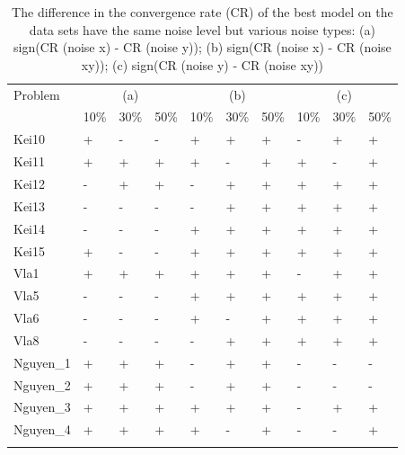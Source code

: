 \begin{table}
\caption{The difference in the convergence rate (CR) of the best model on the data sets have the same noise level but various noise types: (a) sign(CR (noise x) - CR (noise y)); (b) sign(CR (noise x) - CR (noise xy)); (c) sign(CR (noise y) - CR (noise xy))}
\label{tab:difCR2}
\begin{tabular}{l|lll|lll|lll}
\hline\noalign{\smallskip}
Problem & \multicolumn{3}{c|}{(a)} & \multicolumn{3}{c|}{(b)} & \multicolumn{3}{c}{(c)} \\
 & 10\% & 30\%  & 50\%  & 10\% & 30\% & 50\% & 10\% & 30\%  & 50\% \\
\noalign{\smallskip}\hline\noalign{\smallskip}
Kei10 & + & - & - & + & + & + & - & + & + \\
Kei11 & + & + & + & + & - & + & + & - & + \\
Kei12 & - & + & + & - & + & + & + & + & + \\
Kei13 & - & - & - & - & + & + & + & + & + \\
Kei14 & - & - & - & + & + & + & + & + & + \\
Kei15 & + & - & - & + & + & + & + & + & + \\
Vla1 & + & + & + & + & + & + & - & + & + \\
Vla5 & - & - & - & + & + & + & + & + & + \\
Vla6 & - & - & - & + & - & + & + & + & + \\
Vla8 & - & - & - & - & + & + & + & + & + \\
Nguyen\_1 & + & + & + & - & + & + & - & - & - \\
Nguyen\_2 & + & + & + & - & + & + & - & - & - \\
Nguyen\_3 & + & + & + & + & + & + & - & + & + \\
Nguyen\_4 & + & + & + & + & - & + & - & - & + \\
\noalign{\smallskip}\hline
\end{tabular}
\end{table}
